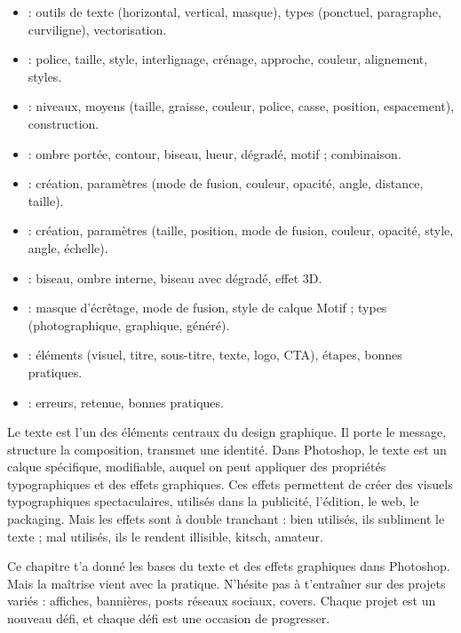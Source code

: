 \begin{itemize}
    \item {} : outils de texte (horizontal, vertical, masque), types (ponctuel, paragraphe, curviligne), vectorisation.
    \item {} : police, taille, style, interlignage, crénage, approche, couleur, alignement, styles.
    \item {} : niveaux, moyens (taille, graisse, couleur, police, casse, position, espacement), construction.
    \item {} : ombre portée, contour, biseau, lueur, dégradé, motif ; combinaison.
    \item {} : création, paramètres (mode de fusion, couleur, opacité, angle, distance, taille).
    \item {} : création, paramètres (taille, position, mode de fusion, couleur, opacité, style, angle, échelle).
    \item {} : biseau, ombre interne, biseau avec dégradé, effet 3D.
    \item {} : masque d'écrêtage, mode de fusion, style de calque Motif ; types (photographique, graphique, généré).
    \item {} : éléments (visuel, titre, sous-titre, texte, logo, CTA), étapes, bonnes pratiques.
    \item {} : erreurs, retenue, bonnes pratiques.
\end{itemize}

Le texte est l'un des éléments centraux du design graphique. Il porte le message, structure la composition, transmet une identité. Dans Photoshop, le texte est un calque spécifique, modifiable, auquel on peut appliquer des propriétés typographiques et des effets graphiques. Ces effets permettent de créer des visuels typographiques spectaculaires, utilisés dans la publicité, l'édition, le web, le packaging. Mais les effets sont à double tranchant : bien utilisés, ils subliment le texte ; mal utilisés, ils le rendent illisible, kitsch, amateur.

Ce chapitre t'a donné les bases du texte et des effets graphiques dans Photoshop. Mais la maîtrise vient avec la pratique. N'hésite pas à t'entraîner sur des projets variés : affiches, bannières, posts réseaux sociaux, covers. Chaque projet est un nouveau défi, et chaque défi est une occasion de progresser.

